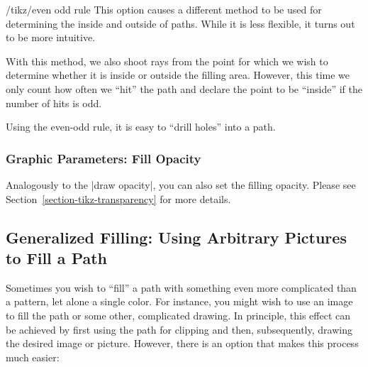 \begin{key}{/tikz/even odd rule}
  This option causes a different method to be used for determining the
  inside and outside of paths. While it is less flexible, it turns out
  to be more intuitive.

  With this method, we also shoot rays from the point for which we
  wish to determine whether it is inside or outside the filling
  area. However, this time we only count how often we ``hit'' the path
  and declare the point to be ``inside'' if the number of hits is odd.

  Using the even-odd rule, it is easy to ``drill holes'' into a path.
  
\begin{codeexample}[]
\end{codeexample}
\end{key}



\subsubsection{Graphic Parameters: Fill Opacity}

\label{section-fill-opacity}
Analogously to the |draw opacity|, you can also set the filling
opacity. Please see Section~\ref{section-tikz-transparency} for more
details. 


\subsection{Generalized Filling: Using Arbitrary Pictures to Fill a Path}

Sometimes you wish to ``fill'' a path with something even more
complicated than a pattern, let alone a single color. For instance,
you might wish to use an image to fill the path or some other,
complicated drawing. In principle, this effect can be achieved
by first using the path for clipping and then, subsequently, drawing
the desired image or picture. However, there is an option that makes
this process much easier:


